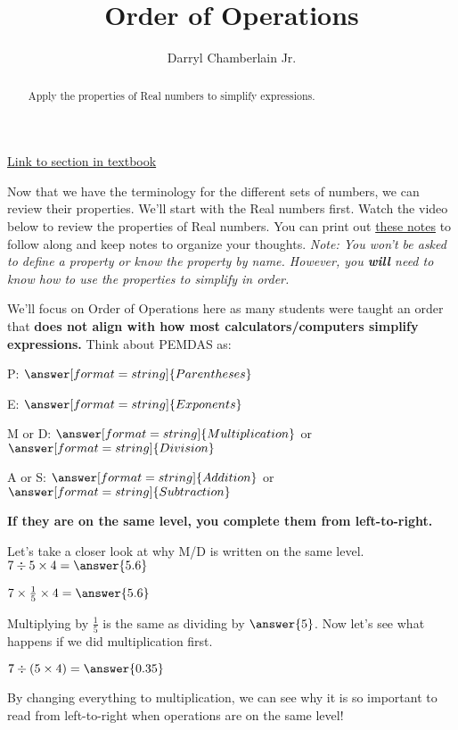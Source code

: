 \documentclass{ximera}
\author{Darryl Chamberlain Jr.}
\title{Order of Operations}
\begin{document}
\begin{abstract}
Apply the properties of Real numbers to simplify expressions.
\end{abstract}
\maketitle

\href{https://cnx.org/contents/mwjClAV_@8.1:0KhpF2RH@23/Real-Numbers-Algebra-Essentials}{Link to section in textbook}


Now that we have the terminology for the different sets of numbers, we can review their properties. We'll start with the Real numbers first. Watch the video below to review the properties of Real numbers. You can print out \href{http://people.clas.ufl.edu/dchamberlain31/files/Objective-3-Order-of-Operations.pdf}{these notes} to follow along and keep notes to organize your thoughts. \textit{Note: You won't be asked to define a property or know the property by name. However, you \textbf{will} need to know how to use the properties to simplify in order.}


We'll focus on Order of Operations here as many students were taught an order that \textbf{does not align with how most calculators/computers simplify expressions.} Think about PEMDAS as:

\begin{question}
P: $\answer[format=string]{Parentheses}$

E: $\answer[format=string]{Exponents}$

M or D: $\answer[format=string]{Multiplication}$ or $\answer[format=string]{Division}$

A or S: $\answer[format=string]{Addition}$ or $\answer[format=string]{Subtraction}$
\end{question}

{\Large \textbf{If they are on the same level, you complete them from left-to-right.}}

\begin{question}
Let's take a closer look at why M/D is written on the same level.
$7 \div 5 \times 4 = \answer{5.6}$

$7 \times \frac{1}{5} \times 4 = \answer{5.6}$

Multiplying by $\frac{1}{5}$ is the same as dividing by $\answer{5}$. Now let's see what happens if we did multiplication first.

$7 \div (5 \times 4) = \answer{0.35}$

By changing everything to multiplication, we can see why it is so important to read from left-to-right when operations are on the same level!
\end{question}
\end{document}
